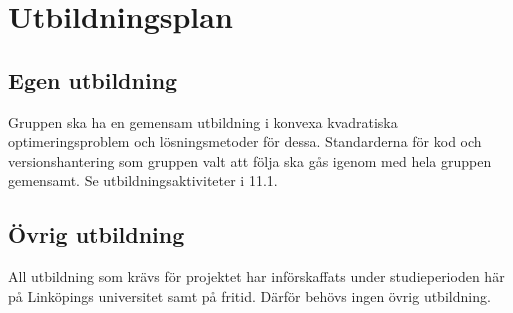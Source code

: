 \section{Utbildningsplan}

\subsection{Egen utbildning}
Gruppen ska ha en gemensam utbildning i konvexa kvadratiska optimeringsproblem och lösningsmetoder för dessa. Standarderna för kod och versionshantering som gruppen valt att följa ska gås igenom med hela gruppen gemensamt. Se utbildningsaktiviteter i 11.1. 

\subsection{Övrig utbildning}
All utbildning som krävs för projektet har införskaffats under studieperioden här på Linköpings universitet samt på fritid. Därför behövs ingen övrig utbildning.

